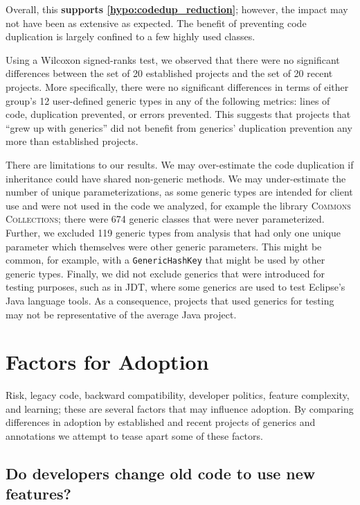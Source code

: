 \documentclass{svjour3}
\newcommand{\code}[1]{\texttt{#1}}
\newcommand{\jdt}{\textsc{JDT}\xspace}
\newcommand{\commons}{\textsc{Commons Collections}\xspace}
\begin{document}
Overall, this \textbf{supports \autoref{hypo:codedup_reduction}}; 
however, the impact may not have been 
as extensive as expected.
The benefit of preventing code duplication is largely confined 
to a few highly used classes.

Using a Wilcoxon signed-ranks test, we observed that
there were no significant differences between the
set of 20 established projects and the set of 20 recent projects.
More specifically, there were no significant differences
in terms of either group's 12 user-defined generic types 
in any of the following metrics:
lines of code, duplication prevented, or errors prevented.
This suggests that projects that ``grew up with generics''
did not benefit from generics' duplication prevention
any more than established projects.

There are limitations to our results.  
We may over-estimate the code duplication if inheritance could have shared non-generic methods.
We may under-estimate the number of unique parameterizations, as some generic types are intended for client use and were not used in the code we analyzed, for example the library \commons; there were 674 generic classes that were never parameterized.
Further, we excluded 119 generic types from analysis that had only one unique parameter which themselves were other generic parameters.  
This might be common, for example, with a \code{GenericHashKey} that might be used by other generic types.
Finally, we did not exclude generics that were introduced for testing purposes,
such as in \jdt, where some generics are used to test Eclipse's Java language tools.
As a consequence, projects that used generics for testing may not be representative
of the average Java project.

\section{Factors for Adoption}\label{sec:adoption}

Risk, legacy code, backward compatibility, developer politics, feature complexity, and learning;
these are several factors that may influence adoption.  By comparing differences in adoption by established and recent projects of generics and annotations 
we attempt to tease apart some of these factors.

\subsection{Do developers change old code to use new features?}\label{sec:rawtypes}
\label{section:old-code}
\end{document}

